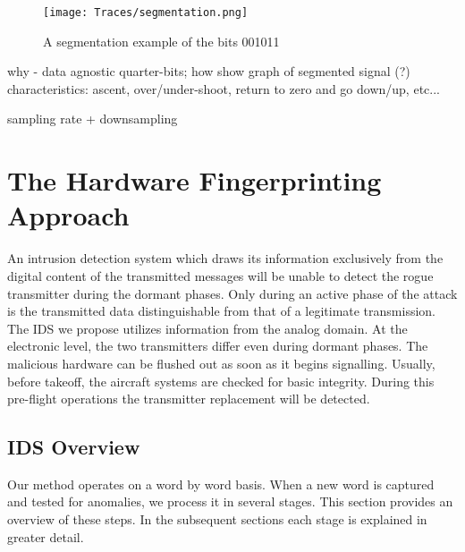 \documentclass[conference]{IEEEtran}
\begin{document}
  \begin{figure}[t]
    \centering
    \texttt{[image: Traces/segmentation.png]}
    \caption{A segmentation example of the bits 001011}
    \label{fig:SegmentationTrace}
  \end{figure}
  
  \color{gray}
  why - data agnostic
  quarter-bits; how
  show graph of segmented signal (?)
  characteristics: ascent, over/under-shoot, return to zero and go down/up,
  etc...

  sampling rate + downsampling
  \color{black}
  
\section{The Hardware Fingerprinting Approach}
  An intrusion detection system which draws its information exclusively from the digital content of the transmitted messages will be unable to detect the rogue transmitter during the dormant phases. Only during an active phase of the attack is the transmitted data distinguishable from that of a legitimate transmission. The IDS we propose utilizes information from the analog domain. At the electronic level, the two transmitters differ even during dormant phases. The malicious hardware can be flushed out as soon as it begins signalling.
  Usually, before takeoff, the aircraft systems are checked for basic integrity. During this pre-flight operations the transmitter replacement will be detected.
  
\subsection{IDS Overview} \label{Overview}
  Our method operates on a word by word basis. When a new word is captured and tested for anomalies, we process it in several stages. This section provides an overview of these steps. In the subsequent sections each stage is explained in greater detail.
  
\end{document}
